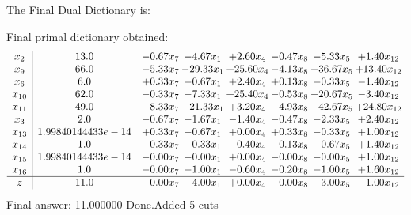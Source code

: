 \documentclass[8pt]{article}
\begin{document}
The Final Dual Dictionary is: 

 Final primal dictionary obtained: 
\[\begin{array}{c| c c@{\hskip 2pt} c@{\hskip 2pt} c@{\hskip 2pt} c@{\hskip 2pt} c@{\hskip 2pt} c@{\hskip 2pt} }
 x_{2}   &  13.0 & -0.67 x_{7} & -4.67 x_{1} & +  2.60 x_{4} & -0.47 x_{8} & -5.33 x_{5} & +  1.40 x_{12}\\
 x_{9}   &  66.0 & -5.33 x_{7} & -29.33 x_{1} & + 25.60 x_{4} & -4.13 x_{8} & -36.67 x_{5} & + 13.40 x_{12}\\
 x_{6}   &  6.0 & +  0.33 x_{7} & -0.67 x_{1} & +  2.40 x_{4} & +  0.13 x_{8} & -0.33 x_{5} & -1.40 x_{12}\\
 x_{10}   &  62.0 & -0.33 x_{7} & -7.33 x_{1} & + 25.40 x_{4} & -0.53 x_{8} & -20.67 x_{5} & -3.40 x_{12}\\
 x_{11}   &  49.0 & -8.33 x_{7} & -21.33 x_{1} & +  3.20 x_{4} & -4.93 x_{8} & -42.67 x_{5} & + 24.80 x_{12}\\
 x_{3}   &  2.0 & -0.67 x_{7} & -1.67 x_{1} & -1.40 x_{4} & -0.47 x_{8} & -2.33 x_{5} & +  2.40 x_{12}\\
 x_{13}   &  1.99840144433e-14 & +  0.33 x_{7} & -0.67 x_{1} & +  0.00 x_{4} & +  0.33 x_{8} & -0.33 x_{5} & +  1.00 x_{12}\\
 x_{14}   &  1.0 & -0.33 x_{7} & -0.33 x_{1} & -0.40 x_{4} & -0.13 x_{8} & -0.67 x_{5} & +  1.40 x_{12}\\
 x_{15}   &  1.99840144433e-14 & -0.00 x_{7} & -0.00 x_{1} & +  0.00 x_{4} & -0.00 x_{8} & -0.00 x_{5} & +  1.00 x_{12}\\
 x_{16}   &  1.0 & -0.00 x_{7} & -1.00 x_{1} & -0.60 x_{4} & -0.20 x_{8} & -1.00 x_{5} & +  1.60 x_{12}\\
\hline
z    &  11.0 & -0.00 x_{7} & -4.00 x_{1} & +  0.00 x_{4} & -0.00 x_{8} & -3.00 x_{5} & -1.00 x_{12}\\
\end{array}\]
 Final answer: 11.000000 
Done.Added 5 cuts 
\end{document}
